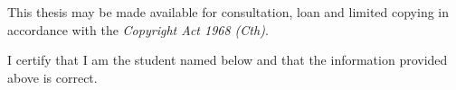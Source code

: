 \noindent
This thesis may be made available for consultation, loan and limited copying in accordance with the \textit{Copyright Act 1968 (Cth)}.
\bigskip

\noindent
I certify that I am the student named below and that the information provided above is correct.

\vspace{2cm}
\noindent
\hspace{\fill}
\parbox[b]{0.4\linewidth}{
  \raggedleft
  \ifdefined{}\else\fi
  
  \vspace{-6mm}
  \hrulefill\\
  \theauthor{}\\
  \footnotesize
  \thedate{}
}
\cleardoubleevenemptypage
